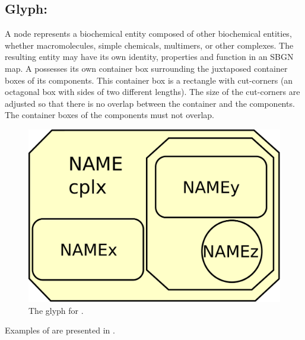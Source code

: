 

\subsection{Glyph: }\label{sec:complex}

A  node represents a biochemical entity composed of other biochemical entities, whether macromolecules, simple chemicals, multimers, or other complexes. The resulting entity may have its own identity, properties and function in an SBGN map. A  possesses its own container box surrounding the juxtaposed container boxes of its components.  This container box is a rectangle with cut-corners (an octagonal box with sides of two different lengths).  The size of the cut-corners are adjusted so that there is no overlap between the container and the components.  The container boxes of the components must not overlap.

\begin{figure}[H]
  \centering
  \includegraphics[scale = 0.3]{images/complex}
  \caption{The \PD glyph for .}
  \label{fig:complex}
\end{figure}


Examples of  are presented in .

